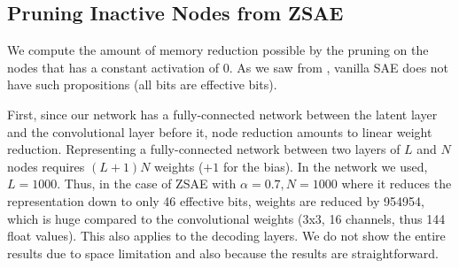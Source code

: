 % 
% 
% 

\subsection{Pruning Inactive Nodes from ZSAE}


We compute the amount of memory reduction possible by the pruning on the nodes
that has a constant activation of 0. As we saw from ,
vanilla SAE does not have such propositions (all bits are effective bits).

First, since our network has a fully-connected network between the
latent layer and the convolutional layer before it, node reduction
amounts to linear weight reduction.  Representing a fully-connected
network between two layers of $L$ and $N$ nodes requires $(L+1)N$
weights ($+1$ for the bias).
In the network we used, $L=1000$. Thus, in the case of ZSAE with $\alpha=0.7, N=1000$
where it reduces the representation down to only 46 effective bits, weights are reduced by 954954,
which is huge compared to the convolutional weights (3x3, 16 channels, thus 144 float values).
This also applies to the decoding layers.
We do not show the entire results due to space limitation and also because the results are straightforward.

